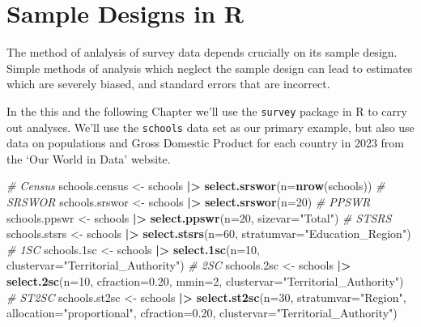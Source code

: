\documentclass[
]{book}
\newenvironment{Shaded}{\begin{snugshade}}{\end{snugshade}}
\newcommand{\AttributeTok}[1]{\textcolor[rgb]{0.13,0.29,0.53}{#1}}
\newcommand{\CommentTok}[1]{\textcolor[rgb]{0.56,0.35,0.01}{\textit{#1}}}
\newcommand{\DecValTok}[1]{\textcolor[rgb]{0.00,0.00,0.81}{#1}}
\newcommand{\FloatTok}[1]{\textcolor[rgb]{0.00,0.00,0.81}{#1}}
\newcommand{\FunctionTok}[1]{\textcolor[rgb]{0.13,0.29,0.53}{\textbf{#1}}}
\newcommand{\NormalTok}[1]{#1}
\newcommand{\OtherTok}[1]{\textcolor[rgb]{0.56,0.35,0.01}{#1}}
\newcommand{\SpecialCharTok}[1]{\textcolor[rgb]{0.81,0.36,0.00}{\textbf{#1}}}
\newcommand{\StringTok}[1]{\textcolor[rgb]{0.31,0.60,0.02}{#1}}
\begin{document}
\chapter{Sample Designs in R}\label{sample-designs-in-r}

The method of anlalysis of survey data depends crucially on its sample
design. Simple methods of analysis which neglect the sample design can
lead to estimates which are severely biased, and standard errors that
are incorrect.

In the this and the following Chapter we'll use the \texttt{survey} package in R to carry out analyses.
We'll use the \texttt{schools} data set as our primary example, but also use
data on populations and Gross Domestic Product for each country in 2023
from the `Our World in Data' website.

\begin{Shaded}
\begin{Highlighting}[]
\CommentTok{\# Census}
\NormalTok{schools.census }\OtherTok{\textless{}{-}}\NormalTok{ schools }\SpecialCharTok{|\textgreater{}} \FunctionTok{select.srswor}\NormalTok{(}\AttributeTok{n=}\FunctionTok{nrow}\NormalTok{(schools))}
\CommentTok{\# SRSWOR}
\NormalTok{schools.srswor }\OtherTok{\textless{}{-}}\NormalTok{ schools }\SpecialCharTok{|\textgreater{}} \FunctionTok{select.srswor}\NormalTok{(}\AttributeTok{n=}\DecValTok{20}\NormalTok{)}
\CommentTok{\# PPSWR}
\NormalTok{schools.ppswr }\OtherTok{\textless{}{-}}\NormalTok{ schools }\SpecialCharTok{|\textgreater{}} \FunctionTok{select.ppswr}\NormalTok{(}\AttributeTok{n=}\DecValTok{20}\NormalTok{, }\AttributeTok{sizevar=}\StringTok{"Total"}\NormalTok{)}
\CommentTok{\# STSRS}
\NormalTok{schools.stsrs }\OtherTok{\textless{}{-}}\NormalTok{ schools }\SpecialCharTok{|\textgreater{}} \FunctionTok{select.stsrs}\NormalTok{(}\AttributeTok{n=}\DecValTok{60}\NormalTok{, }\AttributeTok{stratumvar=}\StringTok{"Education\_Region"}\NormalTok{)}
\CommentTok{\# 1SC}
\NormalTok{schools}\FloatTok{.1}\NormalTok{sc }\OtherTok{\textless{}{-}}\NormalTok{ schools }\SpecialCharTok{|\textgreater{}} \FunctionTok{select.1sc}\NormalTok{(}\AttributeTok{n=}\DecValTok{10}\NormalTok{, }\AttributeTok{clustervar=}\StringTok{"Territorial\_Authority"}\NormalTok{)}
\CommentTok{\# 2SC}
\NormalTok{schools}\FloatTok{.2}\NormalTok{sc }\OtherTok{\textless{}{-}}\NormalTok{ schools }\SpecialCharTok{|\textgreater{}} \FunctionTok{select.2sc}\NormalTok{(}\AttributeTok{n=}\DecValTok{10}\NormalTok{, }\AttributeTok{cfraction=}\FloatTok{0.20}\NormalTok{, }\AttributeTok{mmin=}\DecValTok{2}\NormalTok{, }
                                     \AttributeTok{clustervar=}\StringTok{"Territorial\_Authority"}\NormalTok{)}
\CommentTok{\# ST2SC}
\NormalTok{schools.st2sc }\OtherTok{\textless{}{-}}\NormalTok{ schools }\SpecialCharTok{|\textgreater{}} \FunctionTok{select.st2sc}\NormalTok{(}\AttributeTok{n=}\DecValTok{30}\NormalTok{, }\AttributeTok{stratumvar=}\StringTok{"Region"}\NormalTok{, }\AttributeTok{allocation=}\StringTok{"proportional"}\NormalTok{,}
                                \AttributeTok{cfraction=}\FloatTok{0.20}\NormalTok{, }\AttributeTok{clustervar=}\StringTok{"Territorial\_Authority"}\NormalTok{)}
\end{Highlighting}
\end{Shaded}
\end{document}
